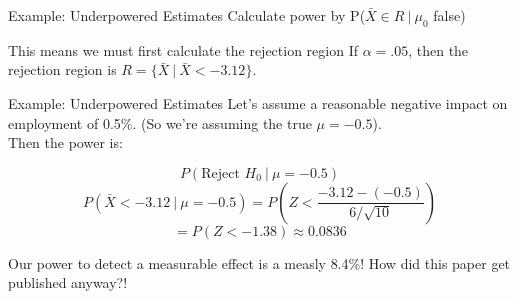 \documentclass{beamer}
\begin{document}
\begin{frame}{Example: Underpowered Estimates}
	Calculate power by P($\bar{X} \in R \ \vert \ \mu_0$ false)
	 
	This means we must first calculate the rejection region
	 If $\alpha=.05$, then the rejection region is $R = \{ \bar{X} \ \vert \ \bar{X} < -3.12 \}$. 
\end{frame}

\begin{frame}{Example: Underpowered Estimates}
	Let's assume a reasonable negative impact on employment of 0.5\%. (So we're assuming the true $\mu=-0.5$). \\

	Then the power is:
			 
	\[
		P(\text{Reject }H_0 \ \vert \ \mu=-0.5)
	\]
	\[
		P(\bar{X}<-3.12 \ \vert \ \mu=-0.5) = P(Z < \frac{-3.12-(-0.5)}{6/\sqrt{10}})
	\]
	\[
		= P(Z < -1.38) \approx 0.0836  
	\]
	
	Our power to detect a measurable effect is a measly 8.4\%! How did this paper get published anyway?!
\end{frame}

	
\end{document}
